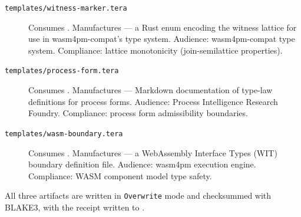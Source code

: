 \begin{description}
  \item[\texttt{templates/witness-marker.tera}]
        Consumes . Manufactures
        --- a Rust enum encoding the witness lattice for use in wasm4pm-compat's
        type system. Audience: wasm4pm-compat type system. Compliance: lattice
        monotonicity (join-semilattice properties).

  \item[\texttt{templates/process-form.tera}]
        Consumes . Manufactures
        --- Markdown documentation of type-law definitions for process forms.
        Audience: Process Intelligence Research Foundry. Compliance: process form
        admissibility boundaries.

  \item[\texttt{templates/wasm-boundary.tera}]
        Consumes . Manufactures
        --- a WebAssembly Interface Types (WIT) boundary definition file.
        Audience: wasm4pm execution engine. Compliance: WASM component model type safety.
\end{description}

All three artifacts are written in \texttt{Overwrite} mode and checksummed with BLAKE3,
with the receipt written to .
